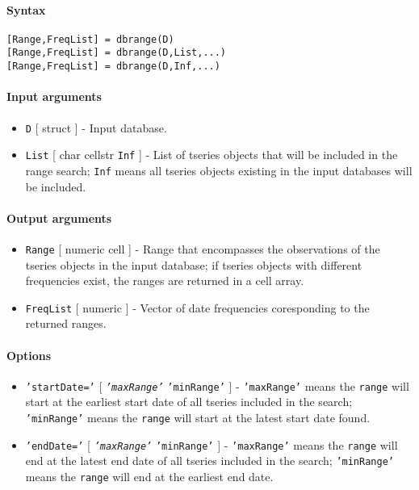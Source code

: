 


	\paragraph{Syntax}

\begin{verbatim}
[Range,FreqList] = dbrange(D)
[Range,FreqList] = dbrange(D,List,...)
[Range,FreqList] = dbrange(D,Inf,...)
\end{verbatim}

\paragraph{Input arguments}

\begin{itemize}
\item
  \texttt{D} {[} struct {]} - Input database.
\item
  \texttt{List} {[} char \textbar{} cellstr \textbar{} \texttt{Inf} {]}
  - List of tseries objects that will be included in the range search;
  \texttt{Inf} means all tseries objects existing in the input databases
  will be included.
\end{itemize}

\paragraph{Output arguments}

\begin{itemize}
\item
  \texttt{Range} {[} numeric \textbar{} cell {]} - Range that
  encompasses the observations of the tseries objects in the input
  database; if tseries objects with different frequencies exist, the
  ranges are returned in a cell array.
\item
  \texttt{FreqList} {[} numeric {]} - Vector of date frequencies
  coresponding to the returned ranges.
\end{itemize}

\paragraph{Options}

\begin{itemize}
\item
  \texttt{'startDate='} {[} \emph{\texttt{'maxRange'}} \textbar{}
  \texttt{'minRange'} {]} - \texttt{'maxRange'} means the \texttt{range}
  will start at the earliest start date of all tseries included in the
  search; \texttt{'minRange'} means the \texttt{range} will start at the
  latest start date found.
\item
  \texttt{'endDate='} {[} \emph{\texttt{'maxRange'}} \textbar{}
  \texttt{'minRange'} {]} - \texttt{'maxRange'} means the \texttt{range}
  will end at the latest end date of all tseries included in the search;
  \texttt{'minRange'} means the \texttt{range} will end at the earliest
  end date.
\end{itemize}

